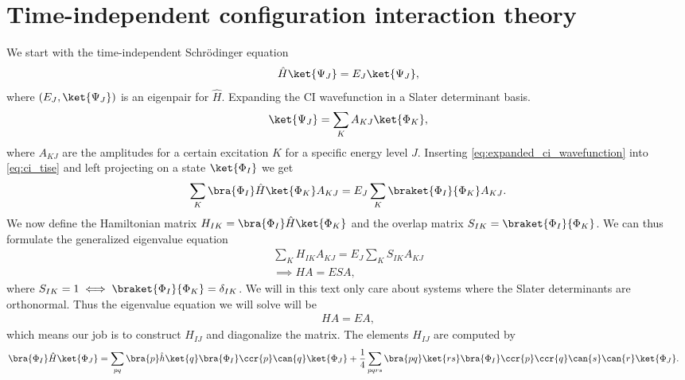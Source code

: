      \section{Time-independent configuration interaction theory}
        We start with the time-independent Schrödinger equation
        \begin{align}
            \hat{H}\ket{\Psi_J} = E_J\ket{\Psi_J},
            \label{eq:ci_tise}
        \end{align}
        where $(E_J, \ket{\Psi_J})$ is an eigenpair for $\hat{H}$. Expanding the
        CI wavefunction in a Slater determinant basis.
        \begin{align}
            \ket{\Psi_J} = \sum_{K} A_{KJ}\ket{\Phi_K},
            \label{eq:expanded_ci_wavefunction}
        \end{align}
        where $A_{KJ}$ are the amplitudes for a certain excitation $K$ for a
        specific energy level $J$. Inserting
        \autoref{eq:expanded_ci_wavefunction} into \autoref{eq:ci_tise} and left
        projecting on a state $\ket{\Phi_I}$ we get
        \begin{align}
            \sum_{K}\bra{\Phi_I}\hat{H}\ket{\Phi_K}A_{KJ}
            = E_J\sum_{K}\braket{\Phi_I}{\Phi_K}A_{KJ}.
        \end{align}
        We now define the Hamiltonian matrix $H_{IK} =
        \bra{\Phi_I}\hat{H}\ket{\Phi_K}$ and the overlap matrix $S_{IK} =
        \braket{\Phi_I}{\Phi_K}$. We can thus formulate the generalized
        eigenvalue equation
        \begin{gather}
            \sum_{K}H_{IK}A_{KJ} = E_J\sum_{K}S_{IK}A_{KJ}
            \\
            \implies
            HA = ESA,
        \end{gather}
        where $S_{IK} = 1 \iff \braket{\Phi_I}{\Phi_K} = \delta_{IK}$. We will
        in this text only care about systems where the Slater determinants are
        orthonormal. Thus the eigenvalue equation we will solve will be
        \begin{align}
            HA = EA,
        \end{align}
        which means our job is to construct $H_{IJ}$ and diagonalize the
        matrix\cite{karwowski}. The elements $H_{IJ}$ are computed by
        \begin{align}
            \bra{\Phi_I}\hat{H}\ket{\Phi_J}
            &= \sum_{pq}\bra{p}\hat{h}\ket{q}
            \bra{\Phi_I}\ccr{p}\can{q}\ket{\Phi_J}
            + \frac{1}{4}\sum_{pqrs}\bra{pq}\ket{rs}
            \bra{\Phi_I}\ccr{p}\ccr{q}\can{s}\can{r}\ket{\Phi_J}.
        \end{align}
